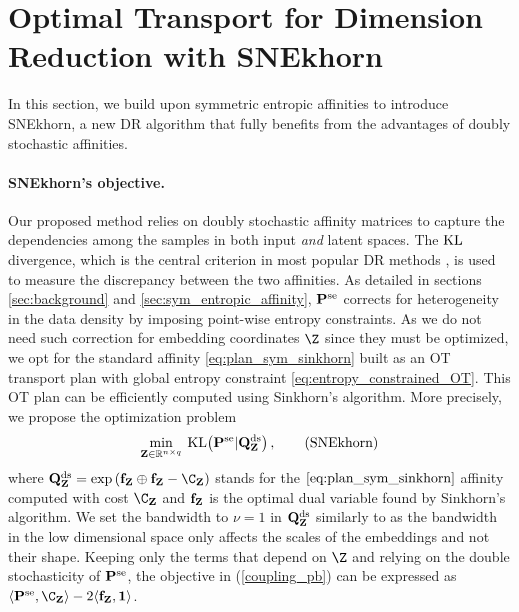 
\section{Optimal Transport for Dimension Reduction with SNEkhorn}\label{sec:DR_with_OT}

In this section, we build upon symmetric entropic affinities to introduce SNEkhorn, a new DR algorithm that fully benefits from the advantages of doubly stochastic affinities.

\paragraph{SNEkhorn's objective.} Our proposed method relies on doubly stochastic affinity matrices to capture the dependencies among the samples in both input \emph{and} latent spaces. The $\operatorname{KL}$ divergence, which is the central criterion in most popular DR methods \cite{van2022probabilistic}, is used to measure the discrepancy between the two affinities. As detailed in sections \ref{sec:background} and \ref{sec:sym_entropic_affinity}, $\mathbf{P}^{\mathrm{se}}$ corrects for heterogeneity in the
data density by imposing point-wise entropy constraints. As we do not need such correction for embedding coordinates $\Z$ since they must be optimized, we opt for the standard affinity \eqref{eq:plan_sym_sinkhorn} built as an OT transport plan with global entropy constraint \eqref{eq:entropy_constrained_OT}. This OT plan can be efficiently computed using Sinkhorn's algorithm. More precisely, 
we propose the optimization problem
\begin{align}\label{coupling_pb}
    \min_{\mathbf{Z} \in \mathbb{R}^{n \times q}} \:  \mathrm{KL}\big(\mathbf{P}^{\mathrm{se}} | \mathbf{Q}^{\mathrm{ds}}_{\mathbf{Z}} \big)\,,
\tag{SNEkhorn}
\end{align}
where $\mathbf{Q}^{\mathrm{ds}}_{\Zb} = \exp \left(\mathbf{f}_{\Zb} \oplus \mathbf{f}_{\Zb} - \C_{\Zb} \right)$ stands for the $\eqref{eq:plan_sym_sinkhorn}$ affinity computed with cost $\C_{\Zb}$ and $\mathbf{f}_{\mathbf{Z}}$ is the optimal dual variable found by Sinkhorn's algorithm.
We set the bandwidth to $\nu = 1$ in $\mathbf{Q}^{\mathrm{ds}}_{\mathbf{Z}}$ similarly to \cite{van2008visualizing} as the bandwidth in the low dimensional space only affects the scales of the embeddings and not their shape.
Keeping only the terms that depend on $\Z$ and relying on the double stochasticity of $\mathbf{P}^{\mathrm{se}}$, the objective in (\ref{coupling_pb}) can be expressed as $\langle \Pb^{\mathrm{se}}, \C_{\Zb} \rangle - 2 \langle \mathbf{f}_{\Zb}, \bm{1} \rangle$. %


